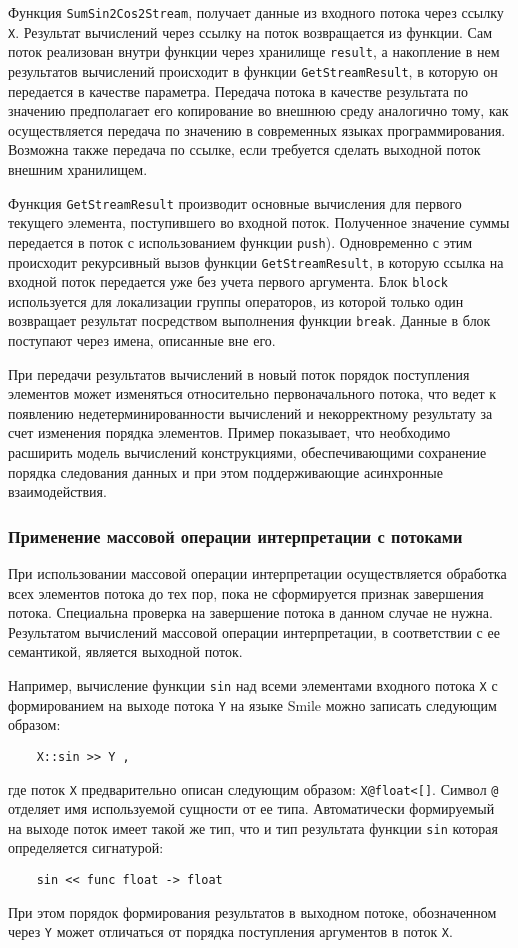Функция \texttt{SumSin2Cos2Stream}, получает данные из входного потока через ссылку \texttt{X}. Результат вычислений через ссылку на поток возвращается из функции. Сам поток реализован внутри функции через хранилище \texttt{result}, а накопление в нем результатов вычислений происходит в функции \texttt{GetStreamResult}, в которую он передается в качестве параметра. Передача потока в качестве результата по значению предполагает его копирование во внешнюю среду аналогично тому, как осуществляется передача по значению в современных языках программирования. Возможна также передача по ссылке, если требуется сделать выходной поток внешним хранилищем.

Функция \texttt{GetStreamResult} производит основные вычисления для первого текущего элемента, поступившего во входной поток. Полученное значение суммы передается в поток с использованием функции \texttt{push}). Одновременно с этим происходит рекурсивный вызов функции \texttt{GetStreamResult}, в которую ссылка на входной поток передается уже без учета первого аргумента. Блок \texttt{block} используется для локализации группы операторов, из которой только один возвращает результат посредством выполнения функции \texttt{break}. Данные в блок поступают через имена, описанные вне его.

При передачи результатов вычислений в новый поток порядок поступления элементов может изменяться относительно первоначального потока, что ведет к появлению недетерминированности вычислений и некорректному результату за счет изменения порядка элементов. Пример показывает, что необходимо расширить модель вычислений конструкциями, обеспечивающими сохранение порядка следования данных и при этом поддерживающие асинхронные взаимодействия.

\subsubsection{Применение массовой операции интерпретации с потоками}
При использовании массовой операции интерпретации осуществляется обработка всех элементов потока до тех пор, пока не сформируется признак завершения потока. Специальна проверка на завершение потока в данном случае не нужна. Результатом вычислений массовой операции интерпретации, в соответствии с ее семантикой, является выходной поток.

Например, вычисление функции \texttt{sin} над всеми элементами входного потока \texttt{X} с формированием на выходе потока \texttt{Y} на языке Smile можно записать следующим образом:
\begin{verbatim}
    X::sin >> Y ,
\end{verbatim}
где поток \texttt{X} предварительно описан следующим образом: \verb|X@float<[]|. Символ \texttt{@} отделяет имя используемой сущности от ее типа. Автоматически формируемый на выходе поток имеет такой же тип, что и тип результата функции \texttt{sin} которая определяется сигнатурой:
\begin{verbatim}
    sin << func float -> float
\end{verbatim}
При этом порядок формирования результатов в выходном потоке, обозначенном через \texttt{Y} может отличаться от порядка поступления аргументов в поток \texttt{X}.

